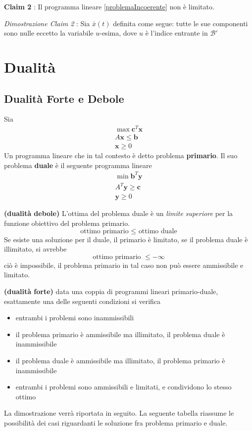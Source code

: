 \documentclass[10pt, letterpaper]{report}
\begin{document}
\bigskip\textbf{Claim 2} : Il programma lineare  \ref{problemaIncoerente} non è limitato.\bigskip 
 
\textit{Dimostrazione Claim 2} : Sia $\bar x(t)$ definita come segue: tutte le sue componenti sono nulle eccetto la variabile $u$-esima, dove $u$ è l'indice entrante in $\mathcal B'$ 
 


\chapter{Dualità}
\section{Dualità Forte e Debole}
\begin{definizione}
    Sia \begin{eqnarray*}
        \max \mathbf c^T\mathbf x\\ 
        A\mathbf x \le \mathbf b \\ 
        \mathbf x \ge 0 
    \end{eqnarray*}
    Un programma lineare che in tal contesto è detto problema \textbf{primario}. Il suo problema \textbf{duale} è il seguente programma lineare 
    \begin{eqnarray*}
        \min \mathbf b^T\mathbf y\\ 
        A^T\mathbf y \ge \mathbf c \\ 
        \mathbf y \ge 0 
    \end{eqnarray*}
\end{definizione}
 \begin{teorema}
    \textbf{(dualità debole)} L'ottima del problema duale è un \textit{limite superiore} per la funzione obiettivo del problema primario. $$ \text{ottimo primario }\le \text{ ottimo duale}$$Se esiste una soluzione per il duale, il primario è limitato, se il problema duale è illimitato, si avrebbe 
    $$ \text{ottimo primario }\le -\infty$$
    ciò è impossibile, il problema primario in tal caso non può essere ammissibile e limitato.
\end{teorema}
\begin{teorema}\label{dualità forte}
\textbf{(dualità forte)} data una coppia di programmi lineari primario-duale, esattamente una delle seguenti condizioni si verifica\begin{itemize}
    \item entrambi i problemi sono inammissibili 
    \item il problema primario è ammissibile ma illimitato, il problema duale è inammissibile 
    \item il problema duale è ammissibile ma illimitato, il problema primario è inammissibile
    \item entrambi i problemi sono ammissibili e limitati, e condividono lo stesso ottimo
\end{itemize}
\end{teorema}
La dimostrazione verrà riportata in seguito. La seguente tabella riassume le possibilità dei casi riguardanti le soluzione fra problema primario e duale.
\end{document}

